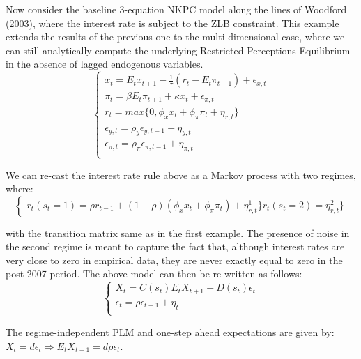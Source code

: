 \documentclass[12pt,reqno]{article}
\numberwithin{equation}{section}
\begin{document}
Now consider the baseline 3-equation NKPC model along the lines of Woodford (2003), where the interest rate is subject to the ZLB constraint. This example extends the results of the previous one to the multi-dimensional case, where we can still analytically compute the underlying Restricted Perceptions Equilibrium in the absence of lagged endogenous variables.\\

$$
\begin{cases} 
x_t = E_t x_{t+1}  -\frac{1}{\tau}(r_t - E_t \pi_{t+1})+ \epsilon_{x,t} \\
\pi_t = \beta E_t \pi_{t+1} + \kappa x_t + \epsilon_{\pi,t} \\
r_t = max\{ 0, \phi_x x_t + \phi_{\pi} \pi_t + \eta_{r,t}\} \\
\epsilon_{y,t} = \rho_y \epsilon_{y,t-1} + \eta_{y,t} \\ 
\epsilon_{\pi,t} = \rho_{\pi} \epsilon_{\pi,t-1} + \eta_{\pi,t} \\
\end{cases} 
$$

We can re-cast the interest rate rule above as a Markov process with two regimes, where: \\

$$
\begin{cases}
r_t (s_t=1) = \rho r_{t-1} +(1-\rho) (\phi_x x_t + \phi_{\pi} \pi_t) + \eta^{1}_{r,t}\} 
r_t (s_t=2) =\eta^{2}_{r,t}\} 
\end{cases}
$$

with the transition matrix same as in the first example. The presence of noise in the second regime is meant to capture the fact that, although interest rates are very close to zero in empirical data, they are never exactly equal to zero in the post-2007 period. The above model can then be re-written as follows: \\

$$
\begin{cases}
X_t = C(s_t) E_t X_{t+1} + D(s_t) \epsilon_t \\
\epsilon_t = \rho \epsilon_{t-1} + \eta_t \\
\end{cases}
$$

The regime-independent PLM and one-step ahead expectations are given by: \\

 $ X_t = d \epsilon_t \Rightarrow E_t X_{t+1} = d \rho \epsilon_t $.\\
\end{document}
